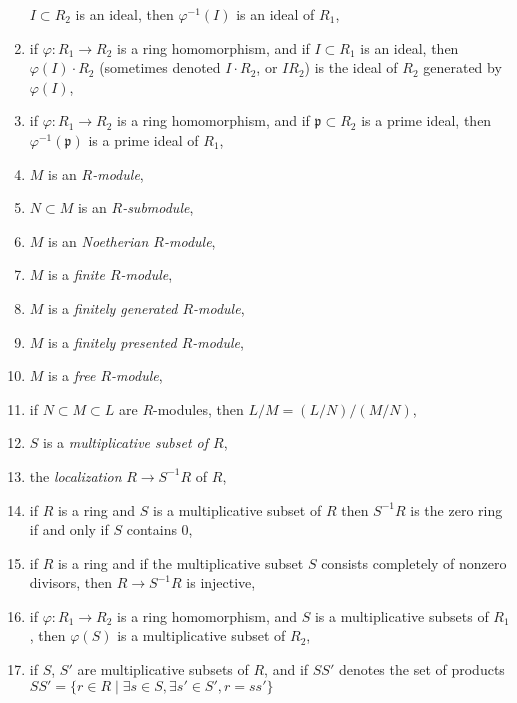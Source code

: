 \begin{enumerate}
$I \subset R_2$ is an ideal, then $\varphi^{-1}(I)$ is an
ideal of $R_1$,
\label{item-inverse-image-ideal}
\item if $\varphi : R_1 \to R_2$ is a ring homomorphism, and if
$I \subset R_1$ is an ideal, then $\varphi(I) \cdot R_2$ (sometimes
denoted $I \cdot R_2$, or $IR_2$) is the ideal of $R_2$ generated
by $\varphi(I)$,
\label{item-image-ideal}
\item if $\varphi : R_1 \to R_2$ is a ring homomorphism, and if
$\mathfrak p \subset R_2$ is a prime ideal, then
$\varphi^{-1}(\mathfrak p)$ is a prime ideal of $R_1$,
\label{item-inverse-image-prime}
\item $M$ is an {\it $R$-module},
\label{item-module}
\item $N \subset M$ is an {\it $R$-submodule},
\label{item-submodule}
\item $M$ is an {\it Noetherian $R$-module},
\label{item-Noetherian-module}
\item $M$ is a {\it finite $R$-module},
\label{item-finite-module}
\item $M$ is a {\it finitely generated $R$-module},
\label{item-finitely-generated-module}
\item $M$ is a {\it finitely presented $R$-module},
\label{item-finitely-presented-module}
\item $M$ is a {\it free $R$-module},
\label{item-free-module}
\item if $N \subset M \subset L$ are $R$-modules,
then $L/M = (L/N)/(M/N)$,
\label{item-isomorphism-theorem}
\item $S$ is a {\it multiplicative subset of $R$},
\label{item-multiplicative-subset}
\item the {\it localization} $R \to S^{-1}R$ of $R$,
\label{item-localization-ring}
\item if $R$ is a ring and $S$ is a multiplicative subset
of $R$ then $S^{-1}R$ is the zero ring if and only if $S$ contains
$0$,
\label{item-localization-zero}
\item if $R$ is a ring and if the multiplicative subset $S$
consists completely of nonzero divisors, then $R \to S^{-1}R$
is injective,
\label{item-localize-nonzerodivisors}
\item if $\varphi : R_1 \to R_2$ is a ring homomorphism, and
$S$ is a multiplicative subsets of $R_1$, then $\varphi(S)$ is
a multiplicative subset of $R_2$,
\item if $S$, $S'$ are multiplicative subsets of $R$,
and if $SS'$ denotes the set of products $SS' =
\{r \in R \mid \exists s\in S, \exists s' \in S', r = ss'\}$

\end{enumerate}

